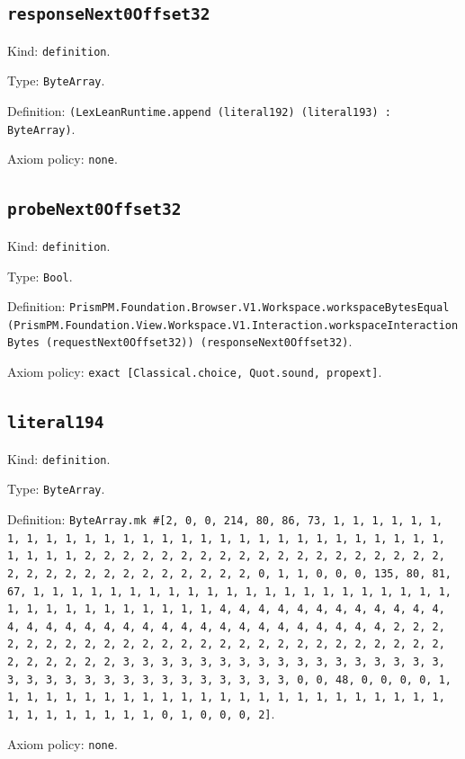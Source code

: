 \documentclass[11pt]{article}
\begin{document}
\subsection*{\texttt{responseNext0Offset32}}
\noindent Kind: \texttt{definition}.\par
\noindent Type: \texttt{ByteArray}.\par
\noindent Definition: \texttt{(LexLeanRuntime.append (literal192) (literal193) : ByteArray)}.\par
\noindent Axiom policy: \texttt{none}.\par
\subsection*{\texttt{probeNext0Offset32}}
\noindent Kind: \texttt{definition}.\par
\noindent Type: \texttt{Bool}.\par
\noindent Definition: \texttt{PrismPM.Foundation.Browser.V1.Workspace.workspaceBytesEqual (PrismPM.Foundation.View.Workspace.V1.Interaction.workspaceInteractionBytes (requestNext0Offset32)) (responseNext0Offset32)}.\par
\noindent Axiom policy: \texttt{exact [Classical.choice, Quot.sound, propext]}.\par
\subsection*{\texttt{literal194}}
\noindent Kind: \texttt{definition}.\par
\noindent Type: \texttt{ByteArray}.\par
\noindent Definition: \texttt{ByteArray.mk \#[2, 0, 0, 214, 80, 86, 73, 1, 1, 1, 1, 1, 1, 1, 1, 1, 1, 1, 1, 1, 1, 1, 1, 1, 1, 1, 1, 1, 1, 1, 1, 1, 1, 1, 1, 1, 1, 1, 1, 1, 2, 2, 2, 2, 2, 2, 2, 2, 2, 2, 2, 2, 2, 2, 2, 2, 2, 2, 2, 2, 2, 2, 2, 2, 2, 2, 2, 2, 2, 2, 2, 2, 0, 1, 1, 0, 0, 0, 135, 80, 81, 67, 1, 1, 1, 1, 1, 1, 1, 1, 1, 1, 1, 1, 1, 1, 1, 1, 1, 1, 1, 1, 1, 1, 1, 1, 1, 1, 1, 1, 1, 1, 1, 1, 1, 4, 4, 4, 4, 4, 4, 4, 4, 4, 4, 4, 4, 4, 4, 4, 4, 4, 4, 4, 4, 4, 4, 4, 4, 4, 4, 4, 4, 4, 4, 4, 4, 2, 2, 2, 2, 2, 2, 2, 2, 2, 2, 2, 2, 2, 2, 2, 2, 2, 2, 2, 2, 2, 2, 2, 2, 2, 2, 2, 2, 2, 2, 2, 2, 3, 3, 3, 3, 3, 3, 3, 3, 3, 3, 3, 3, 3, 3, 3, 3, 3, 3, 3, 3, 3, 3, 3, 3, 3, 3, 3, 3, 3, 3, 3, 3, 0, 0, 48, 0, 0, 0, 0, 1, 1, 1, 1, 1, 1, 1, 1, 1, 1, 1, 1, 1, 1, 1, 1, 1, 1, 1, 1, 1, 1, 1, 1, 1, 1, 1, 1, 1, 1, 1, 1, 0, 1, 0, 0, 0, 2]}.\par
\noindent Axiom policy: \texttt{none}.\par
\end{document}
